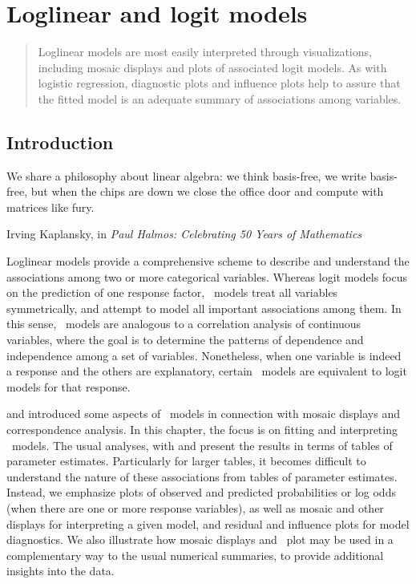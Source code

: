 \chapter{Loglinear and logit models}\label{ch:loglin}

\begin{quote}
{\Large
Loglinear models are most easily interpreted through
visualizations, including mosaic displays and plots of associated
logit models.  As with logistic regression, diagnostic plots
and influence plots help to assure that the fitted model is
an adequate summary of associations among variables.
}
\end{quote}
\minitoc

\section{Introduction}
\epigraph{We share a philosophy about linear algebra: we think
basis-free, we write basis-free, but when the chips are down we close
the office door and compute with matrices like fury.}
{Irving Kaplansky, in \emph{Paul Halmos: Celebrating 50 Years of Mathematics}}

Loglinear models provide a comprehensive scheme to describe and
understand the associations among two or more categorical variables.
Whereas logit models focus on the prediction of one response factor,
\loglin\ models treat all variables symmetrically, and attempt to
model all important associations among them.  In this sense,
\loglin\ models are analogous to a correlation analysis of continuous
variables, where the goal is to determine the patterns of dependence
and independence among a set of variables.   Nonetheless, when
one variable is indeed a response and the others are explanatory,
certain \loglin\ models are equivalent to logit models for that
response.

 and  introduced some aspects of
\loglin\ models in connection with mosaic displays and correspondence analysis.  
In this chapter, the focus is on fitting and interpreting
\loglin\ models.  The usual analyses, with  and
 present the results in terms of tables of parameter
estimates.  Particularly for larger tables, it becomes difficult
to understand the nature of these associations from tables
of parameter estimates.  Instead, we emphasize plots of observed
and predicted probabilities or log odds (when there are one or more response
variables), as well as mosaic and other displays for interpreting a given
model, and residual and influence plots for model diagnostics.
We also illustrate how mosaic displays and \CA\ plot may be used
in a complementary way to the usual numerical summaries, to provide
additional insights into the data.

